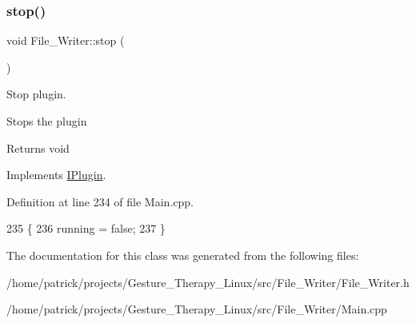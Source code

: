 \subsubsection{\texorpdfstring{stop()}{stop()}}
{\footnotesize\ttfamily void File\+\_\+\+Writer\+::stop (\begin{DoxyParamCaption}{ }\end{DoxyParamCaption})\hspace{0.3cm}{\ttfamily [virtual]}}



Stop plugin. 

Stops the plugin \begin{DoxyReturn}{Returns}
void 
\end{DoxyReturn}


Implements \hyperlink{class_i_plugin_a86e523c283aec5c9fb21249a76e916ac}{I\+Plugin}.



Definition at line 234 of file Main.\+cpp.


\begin{DoxyCode}
235 \{
236     running = \textcolor{keyword}{false};
237 \}
\end{DoxyCode}


The documentation for this class was generated from the following files\+:\begin{DoxyCompactItemize}
\item 
/home/patrick/projects/\+Gesture\+\_\+\+Therapy\+\_\+\+Linux/src/\+File\+\_\+\+Writer/File\+\_\+\+Writer.\+h\item 
/home/patrick/projects/\+Gesture\+\_\+\+Therapy\+\_\+\+Linux/src/\+File\+\_\+\+Writer/Main.\+cpp\end{DoxyCompactItemize}
